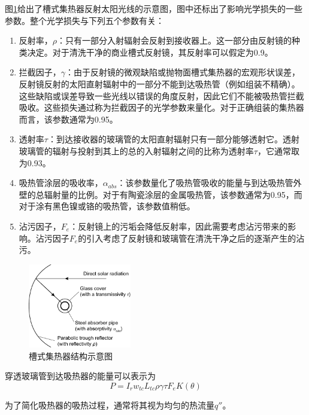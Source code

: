图\ref{fig:ParabolicTrough}给出了槽式集热器反射太阳光线的示意图，图中还标出了影响光学损失的一些参数。整个光学损失与下列五个参数有关：

\begin{enumerate}[label=(\arabic*)]
  \item 反射率，$\rho$：只有一部分入射辐射会反射到接收器上。这一部分由反射镜的种类决定。对于清洗干净的商业槽式反射镜，其反射率可以假定为0.9。
  \item 拦截因子，$\gamma$：由于反射镜的微观缺陷或抛物面槽式集热器的宏观形状误差，反射镜反射的太阳直射辐射中的一部分不能到达吸热管（例如组装不精确）。这些缺陷或误差导致一些光线以错误的角度反射，因此它们不能被吸热管拦截吸收。这些损失通过称为拦截因子的光学参数来量化。对于正确组装的集热器而言，该参数通常为0.95。
  \item 透射率$\tau$：到达接收器的玻璃管的太阳直射辐射只有一部分能够透射它。透射玻璃管的辐射与投射到其上的总的入射辐射之间的比称为透射率$\tau$，它通常取为0.93。
  \item 吸热管涂层的吸收率，$\alpha_{abs}$：该参数量化了吸热管吸收的能量与到达吸热管外壁的总辐射量的比例。对于有陶瓷涂层的金属吸热管，该参数通常为0.95，而对于涂有黑色镍或铬的吸热管，该参数值稍低。
  \item 沾污因子，$F_e$：反射镜上的污垢会降低反射率，因此需要考虑沾污带来的影响。沾污因子$F_e$的引入考虑了反射镜和玻璃管在清洗干净之后的逐渐产生的沾污。
\end{enumerate}

\begin{figure}[!ht]
\centering
\includegraphics[width=0.4\textwidth]{fig/ParametersOfParabolicDish.pdf}
\caption{槽式集热器结构示意图}\label{fig:ParabolicTrough}
\end{figure}

穿透玻璃管到达吸热器的能量可以表示为
\begin{equation}
  P = I_r w_{tc} L_{tc} \rho \gamma \tau F_e K(\theta)
\end{equation}

为了简化吸热器的吸热过程，通常将其视为均匀的热流量$q''$。

